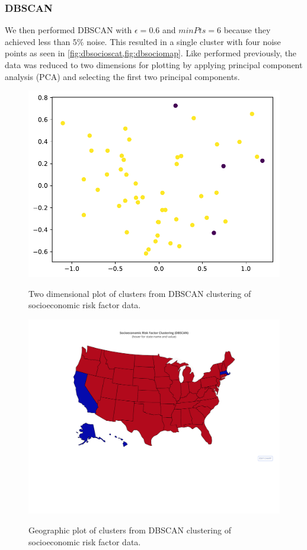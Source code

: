 \documentclass{article}
\begin{document}
\subsubsection{DBSCAN}
We then performed DBSCAN with $\epsilon = 0.6$ and $minPts = 6$ because they achieved less than $5\%$ noise. This resulted in a single cluster with four noise points as seen in \cref{fig:dbsocioscat,fig:dbsociomap}. Like performed previously, the data was reduced to two dimensions for plotting by applying principal component analysis (PCA) and selecting the first two principal components.

\begin{figure}[h]
\centering
\caption{Two dimensional plot of clusters from DBSCAN clustering of socioeconomic risk factor data.}
\includegraphics[width=\linewidth]{images/socioeconomic_risk_factors_dbscan_2d_plot.pdf}
\label{fig:dbsocioscat}
\end{figure}

\begin{figure}[h]
\centering
\caption{Geographic plot of clusters from DBSCAN clustering of socioeconomic risk factor data.}
\includegraphics[width=\linewidth]{images/socioeconomic_risk_factor_dbscan_map.pdf}
\label{fig:dbsociomap}
\end{figure}
\end{document}
